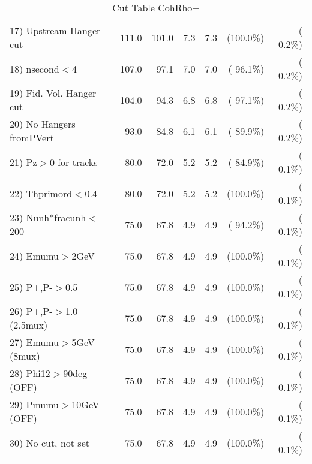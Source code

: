 \begin{table}[h!]
\begin{tabular}{||l||r|r|r|r|r|r||}
 17) Upstream Hanger cut  &        111.0 &        101.0 &          7.3 &          7.3 & (100.0\%) & (  0.2\%) \\
 18) nsecond$<$4          &        107.0 &         97.1 &          7.0 &          7.0 & ( 96.1\%) & (  0.2\%) \\
 19) Fid. Vol. Hanger cut &        104.0 &         94.3 &          6.8 &          6.8 & ( 97.1\%) & (  0.2\%) \\
 20) No Hangers fromPVert &         93.0 &         84.8 &          6.1 &          6.1 & ( 89.9\%) & (  0.2\%) \\
 21) Pz$>$0 for tracks    &         80.0 &         72.0 &          5.2 &          5.2 & ( 84.9\%) & (  0.1\%) \\
 22) Thprimord$<$0.4      &         80.0 &         72.0 &          5.2 &          5.2 & (100.0\%) & (  0.1\%) \\
 23) Nunh*fracunh$<$200   &         75.0 &         67.8 &          4.9 &          4.9 & ( 94.2\%) & (  0.1\%) \\
 24) Emumu$>$2GeV         &         75.0 &         67.8 &          4.9 &          4.9 & (100.0\%) & (  0.1\%) \\
 25) P+,P-$>$0.5          &         75.0 &         67.8 &          4.9 &          4.9 & (100.0\%) & (  0.1\%) \\
 26) P+,P-$>$1.0 (2.5mux) &         75.0 &         67.8 &          4.9 &          4.9 & (100.0\%) & (  0.1\%) \\
 27) Emumu$>$5GeV  (8mux) &         75.0 &         67.8 &          4.9 &          4.9 & (100.0\%) & (  0.1\%) \\
 28) Phi12$>$90deg  (OFF) &         75.0 &         67.8 &          4.9 &          4.9 & (100.0\%) & (  0.1\%) \\
 29) Pmumu$>$10GeV  (OFF) &         75.0 &         67.8 &          4.9 &          4.9 & (100.0\%) & (  0.1\%) \\
 30) No cut, not set      &         75.0 &         67.8 &          4.9 &          4.9 & (100.0\%) & (  0.1\%) \\
 \hline
 \hline
 \end{tabular}
 \caption{Cut Table  CohRho+  }
 \label{tab-cutcohjpsi-mumu_anumunc}
 \end{table}
